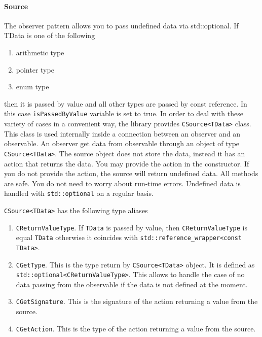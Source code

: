 \documentclass{article}
\begin{document}
\paragraph{Source}

The observer pattern allows you to pass undefined data via std::optional. If TData is one of the following
\begin{enumerate}
\item arithmetic type
\item pointer type
\item enum type
\end{enumerate}
then it is passed by value and all other types are passed by const reference. In this case \verb"isPassedByValue" variable is set to true. In order to deal with these variety of cases in a convenient way, the library provides \verb"CSource<TData>" class. This class is used internally inside a connection between an observer and an observable. An observer get data from observable through an object of type \verb"CSource<TData>". The source object does not store the data, instead it has an action that returns the data. You may provide the action in the constructor. If you do not provide the action, the source will return undefined data. All methods are safe. You do not need to worry about run-time errors. Undefined data is handled with \verb"std::optional" on a regular basis.

\verb"CSource<TData>" has the following type aliases
\begin{enumerate}
\item \verb"CReturnValueType". If \verb"TData" is passed by value, then \verb"CReturnValueType" is equal \verb"TData" otherwise it coincides with \verb"std::reference_wrapper<const TData>".

\item \verb"CGetType". This is the type return by \verb"CSource<TData>" object. It is defined as \verb"std::optional<CReturnValueType>". This allows to handle the case of no data passing from the observable if the data is not defined at the moment.

\item \verb"CGetSignature". This is the signature of the action returning a value from the source.

\item \verb"CGetAction". This is the type of the action returning a value from the source.
\end{enumerate}
\end{document}
